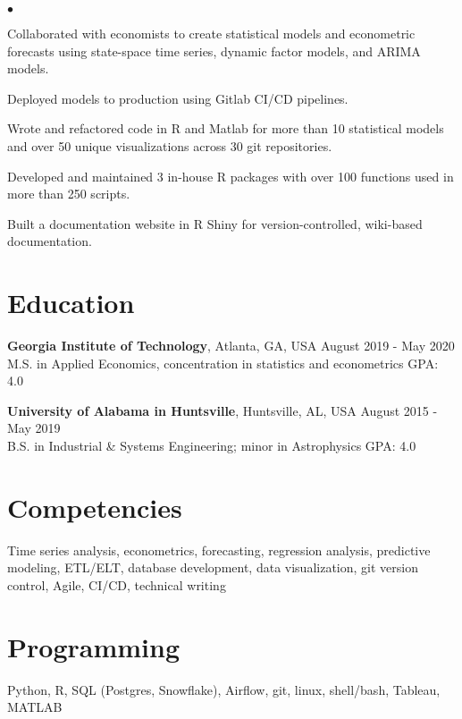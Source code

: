 \documentclass[margin, line]{res}
\newenvironment{list2}{
  \begin{list}{$\bullet$}{%
      \setlength{\itemsep}{0.04in}
      \setlength{\parsep}{0in} \setlength{\parskip}{0in}
      \setlength{\topsep}{0.05in} \setlength{\partopsep}{0in} 
      \setlength{\leftmargin}{\dimexpr 26pt-0.05in}}}
    {\end{list}}
\begin{document}
\begin{resume}
    \begin{list2}
        \item Collaborated with economists to create statistical models and econometric forecasts using state-space time series, dynamic factor models, and ARIMA models.
        \item Deployed models to production using Gitlab CI/CD pipelines.
        \item Wrote and refactored code in R and Matlab for more than 10 statistical models and over 50 unique visualizations across 30 git repositories. 
        \item Developed and maintained 3 in-house R packages with over 100 functions used in more than 250 scripts.
        \item Built a documentation website in R Shiny for version-controlled, wiki-based documentation.
    \end{list2}


\section{\sc Education }

{\bf Georgia Institute of Technology}, Atlanta, GA, USA \hfill August 2019 - May 2020\\
M.S. in Applied Economics, concentration in statistics and econometrics \hfill GPA: 4.0


{\bf University of Alabama in Huntsville}, Huntsville, AL, USA \hfill August 2015 - May 2019 \\
B.S. in Industrial \& Systems Engineering; minor in Astrophysics \hfill GPA: 4.0

\section{\sc Competencies} 
Time series analysis, econometrics, forecasting, regression analysis, predictive modeling, ETL/ELT, database development, data visualization, git version control, Agile, CI/CD, technical writing

\section{\sc Programming} 
Python, R, SQL (Postgres, Snowflake), Airflow, git, linux, shell/bash, Tableau, MATLAB

\end{resume}
\end{document}
